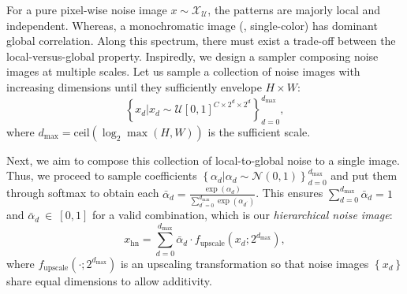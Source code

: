 \begin{foldable} %
    For a pure pixel-wise noise image $x\sim\mathcal{X_{\mathcal{U}}}$, the patterns are majorly local and independent.
    Whereas, a monochromatic image (\ie, single-color) has dominant global correlation.
    Along this spectrum, there must exist a trade-off between the local-versus-global property.
    Inspiredly, we design a sampler composing noise images at multiple scales.
    Let us sample a collection of noise images with increasing dimensions until they sufficiently envelope $H\times W$:
    \begin{equation} \label{eq:synthesis-hiernoise-multiscale}
        \left\{ x_{d}|x_{d}\sim\mathcal{U}\left[0,1\right]^{C\times2^{d}\times2^{d}}\right\} _{d=0}^{d_{\text{max}}},
    \end{equation}
    where $d_{\text{max}}=\text{ceil}\left(\log_{2}\max\left(H,W\right)\right)$ is the sufficient scale.
\end{foldable}

\begin{foldable} %
    Next, we aim to compose this collection of local-to-global noise to a single image.
    Thus, we proceed to sample coefficients $\displaystyle \left\{ \alpha_{d}|\alpha_{d}\sim\mathcal{N}\left(0,1\right) \right\}_{d=0}^{d_{\text{max}}}$ and put them through softmax to obtain each $\displaystyle \bar{\alpha}_{d}=\frac{\exp\left(\alpha_{d}\right)}{\sum_{d^\prime=0}^{d_\text{max}}\exp\left(\alpha_{d^\prime}\right)}$.
    This ensures $\sum_{d=0}^{d_{\text{max}}}\bar{\alpha}_{d}=1$ and $\bar{\alpha}_{d}~\in~[0, 1]$ for a valid combination, which is our \textit{hierarchical noise image}:
    \begin{equation} \label{eq:synthesis-hiernoise-combine}
        x_{\text{hn}}=\sum_{d=0}^{d_{\text{max}}}\bar{\alpha}_{d}\cdot f_{\text{upscale}}\left(x_{d};2^{d_\text{max}}\right),
    \end{equation}
    where $f_{\text{upscale}}\left(\cdot;2^{d_{\text{max}}}\right)$ is an upscaling transformation so that noise images $\left\{ x_{d}\right\}$  share equal dimensions to allow additivity.
\end{foldable}

